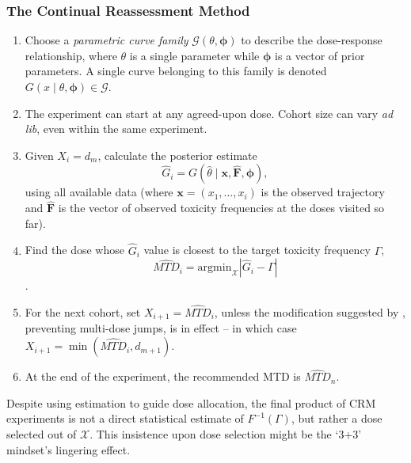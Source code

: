 \subsubsection{The Continual Reassessment Method }
\begin{enumerate}
\item Choose a \emph{parametric curve family} $\mathcal{G}\left(\theta,\boldsymbol{\phi}\right)$ to describe the dose-response relationship, where $\theta$ is a single parameter while $\boldsymbol{\phi}$ is a vector of prior parameters. A single curve belonging to this family is denoted\ $G\left(x\mid\theta,\boldsymbol{\phi}\right)\in\mathcal{G}$.
\item The experiment can start at any agreed-upon dose. Cohort size can vary \emph{ad lib}, even within the same experiment.
\item Given $X_i=d_m$, calculate the posterior estimate
$$\hat{G}_i=G\left(\hat{\theta}\mid \mathbf{x,\hat{F}},\boldsymbol{\phi}\right),$$
using all available data (where  $\mathbf{x}=\left(x_1,\ldots ,x_i\right)$ is the observed trajectory and $\mathbf{\hat{F}}$ is the vector of observed toxicity frequencies at the doses visited so far).
\item Find the dose whose $\hat{G}_i$ value is closest to the target toxicity frequency $\Gamma$, $$\widehat{MTD}_i=\mathrm{arg min}_{\mathcal{X}}\left|\hat{G}_i-\Gamma\right|$$.
\item For the next cohort, set $X_{i+1}=\widehat{MTD}_i$, unless the modification suggested by \cite{Good:Zahu:Pian:some:1995}, preventing multi-dose jumps, is in effect -- in which case $X_{i+1}=\min\left(\widehat{MTD}_i,d_{m+1}\right)$.
\item At the end of the experiment, the recommended MTD is $\widehat{MTD}_n$.
\end{enumerate}

\noindent Despite using estimation to guide dose allocation, the final product of CRM experiments is not a direct statistical estimate of $F^{-1}(\Gamma)$, but rather a dose selected out of $\mathcal{X}$. This insistence upon dose selection might be the `3+3' mindset's lingering effect.

